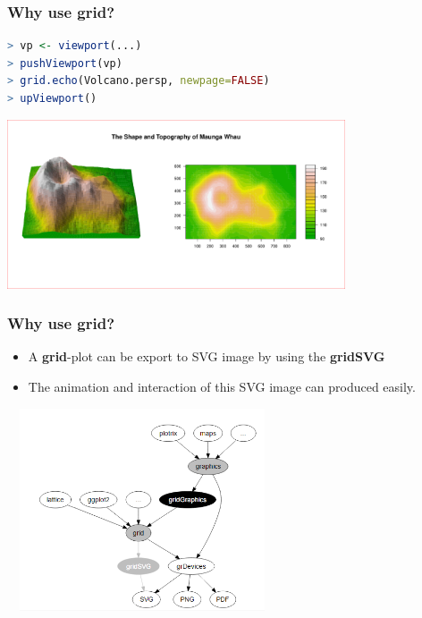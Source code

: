 \documentclass{beamer}
\begin{document}
\begin{frame}[fragile]
\frametitle{Why use \textbf{grid}?}

\begin{lstlisting}[language = R]
> vp <- viewport(...)
> pushViewport(vp)
> grid.echo(Volcano.persp, newpage=FALSE)
> upViewport()
\end{lstlisting}

\begin{center}
  \includegraphics[height = 5cm, width = 10cm]{plot/demo_grid_example_3.pdf}
\end{center}

\end{frame}


\begin{frame}[fragile]
\frametitle{Why use \textbf{grid}?}
\begin{itemize}
  \item A \textbf{grid}-plot can be export to SVG image by using the \textbf{gridSVG}
  \item The animation and interaction of this SVG image can produced easily.
\end{itemize}

\begin{center}
\includegraphics[width = 8cm, height = 6cm]{plot/grid_graphics.png}
\end{center}
\end{frame}
\end{document}
